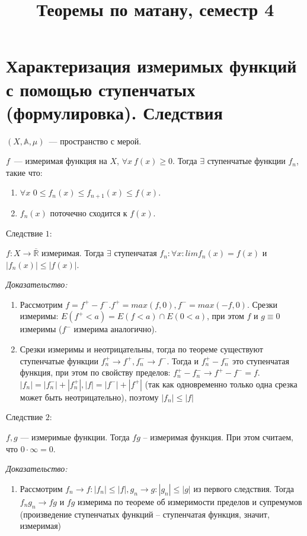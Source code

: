 \documentclass[paper=a4, fontsize=17pt]{article}
\title{Теоремы по матану, семестр 4}
\begin{document}
\maketitle
\tableofcontents
\newpage

\section{Характеризация измеримых функций с помощью ступенчатых (формулировка). Следствия}
$(X,\mathds{A},\mu)$~--- пространство с мерой.

$f$~--- измеримая функция на $X$, $\forall x\ f(x) \geq 0$. Тогда $\exists$ ступенчатые функции $f_n$, такие что:
\begin{enumerate}
    \item $\forall x$ $0 \leq f_n(x) \leq f_{n+1}(x) \leq f(x)$.
    \item $f_n(x)$ поточечно сходится к $f(x)$.
\end{enumerate}

Следствие $1$:

$f: X \rightarrow \overline {\mathds{R}}$ измеримая. Тогда $\exists$ ступенчатая $f_n: \forall x:  lim f_n(x) = f(x)$ и $|f_n(x)| \leq |f(x)|$.

\emph{Доказательство:}

\begin{enumerate}
	\item Рассмотрим $f = f^+ - f^-. f^+ = max(f, 0), f^- = max(-f, 0)$. Срезки измеримы: $E(f^+  < a) = E(f < a) \cap E(0 < a)$, при этом $f$  и $g \equiv 0$ измеримы ($f^-$ измерима аналогично).
	\item Срезки измеримы и неотрицательны, тогда по теореме существуют ступенчатые функции $f^+_n \rightarrow f^+, f^-_n \rightarrow f^-$. Тогда и $f^+_n - f^-_n$ это ступенчатая функция, при этом по свойству пределов: $f^+_n - f^-_n \rightarrow f^+ - f^- = f$. $|f_n| = |f_n^-| + |f_n^+|, |f| = |f^-| + |f^+|$ (так как одновременно только одна срезка может быть неотрицательно), поэтому $|f_n| \leqslant |f|$
\end{enumerate}

Следствие $2$:

$f, g$ --- измеримые функции. Тогда $fg$ -- измеримая функция. При этом считаем, что $0 \cdot \infty = 0$.

\emph{Доказательство:}
\begin{enumerate}
	\item Рассмотрим $f_n \rightarrow f: |f_n| \leq |f|, g_n \rightarrow g: |g_n| \leq |g|$ из первого следствия. Тогда $f_ng_n \rightarrow fg$ и $fg$ измерима по теореме об измеримости пределов и супремумов (произведение ступенчатых функций -- ступенчатая функция, значит, измеримая)
\end{enumerate}
\end{document}
